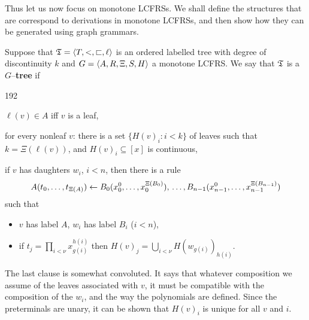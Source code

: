 Thus let us now focus on monotone LCFRSs. We shall define the 
structures that are correspond to derivations in monotone LCFRSs, 
and then show how they can be generated using graph grammars.
\begin{defn}
Suppose that $\mathfrak{T} = \langle T, <, \sqsubset, \ell\rangle$ is an ordered labelled 
tree with degree of discontinuity $k$ and $G = \langle A, R, \Xi, S, H\rangle$ 
a monotone LCFRS. We say that $\mathfrak{T}$ is a $G$--\textbf{tree} if 
\begin{dingautolist}{192}
\item $\ell(v) \in A$ iff $v$ is a leaf, 
\item for every nonleaf $v$: there is a set $\{H(v)_i : i < k\}$ 
	of leaves such that $k = \Xi(\ell(v))$, and 
	$H(v)_i \subseteq [x]$ is continuous, 
\item if $v$ has daughters $w_i$, $i < n$, then there is a rule
	$$A(t_0, \ldots, t_{\Xi(A)}) \leftarrow 
	B_0(x_0^0, \dotsc, x_0^{\Xi(B_0)}), \\ \dotsc, 
	B_{n-1}(x_{n-1}^0, \dotsc, x_{n-1}^{\Xi(B_{n-1})})$$
	such that 
	\begin{itemize}
	\item
	$v$ has label $A$, $w_i$ has label $B_i$ ($i < n$), 
	\item	
	if $t_j = \prod_{i < \nu} x_{g(i)}^{h(i)}$ then $H(v)_j = 
	\bigcup_{i < \nu} H(w_{g(i)})_{h(i)}$.
	\end{itemize}
\end{dingautolist}
\end{defn}
The last clause is somewhat convoluted. It says that whatever 
composition we assume of the leaves associated with $v$, it must 
be compatible with the composition of the $w_i$, and the way the 
polynomials are defined. Since the preterminals are unary, it can 
be shown that $H(v)_i$ is unique for all $v$ and $i$.

